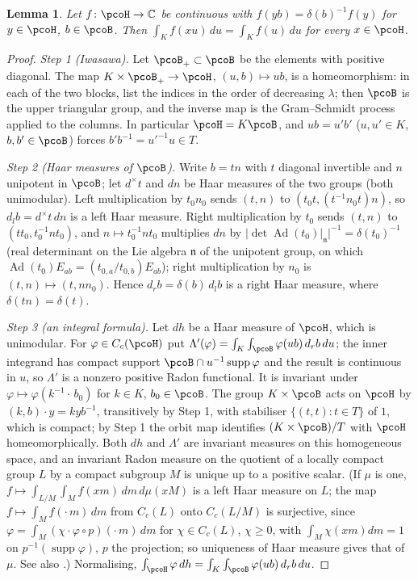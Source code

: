 \documentclass[10pt]{amsart}
\newtheorem{lemma}[theorem]{Lemma}
\theoremstyle{definition}
\theoremstyle{remark}
\newcommand{\C}{\mathbb C}
\begin{document}
\begin{lemma}\label{pco:density}
Let $f\colon\pcoH\to\C$ be continuous with $f(yb)=\delta(b)^{-1}f(y)$ for $y\in\pcoH$, $b\in\pcoB$.
Then $\int_Kf(xu)\,du=\int_Kf(u)\,du$ for every $x\in\pcoH$.
\end{lemma}
\begin{proof}
\emph{Step 1 (Iwasawa).} Let $\pcoB_+\subset\pcoB$ be the elements with positive diagonal. The map
$K\times\pcoB_+\to\pcoH$, $(u,b)\mapsto ub$, is a homeomorphism: in each of the two blocks, list
the indices in the order of decreasing $\lambda$; then $\pcoB$ is the upper triangular group, and
the inverse map is the Gram--Schmidt process applied to the columns. In particular $\pcoH=K\pcoB$,
and $ub=u'b'$ ($u,u'\in K$, $b,b'\in\pcoB$) forces $b'b^{-1}=u'^{-1}u\in T$.

\emph{Step 2 (Haar measures of $\pcoB$).} Write $b=tn$ with $t$ diagonal invertible and $n$
unipotent in $\pcoB$; let $d^\times t$ and $dn$ be Haar measures of the two groups (both
unimodular). Left multiplication by $t_0n_0$ sends $(t,n)$ to $(t_0t,(t^{-1}n_0t)n)$, so
$d_lb=d^\times t\,dn$ is a left Haar measure. Right multiplication by $t_0$ sends $(t,n)$ to
$(tt_0,t_0^{-1}nt_0)$, and $n\mapsto t_0^{-1}nt_0$ multiplies $dn$ by $|\det\operatorname{Ad}(t_0)|
_{\mathfrak n}|^{-1}=\delta(t_0)^{-1}$ (real determinant on the Lie algebra $\mathfrak n$ of the
unipotent group, on which $\operatorname{Ad}(t_0)E_{ab}=(t_{0,a}/t_{0,b})E_{ab}$); right
multiplication by $n_0$ is $(t,n)\mapsto(t,nn_0)$. Hence $d_rb=\delta(b)\,d_lb$ is a right Haar
measure, where $\delta(tn)=\delta(t)$.

\emph{Step 3 (an integral formula).} Let $dh$ be a Haar measure of $\pcoH$, which is unimodular. For
$\varphi\in C_c(\pcoH)$ put $\Lambda'(\varphi)=\int_K\int_{\pcoB}\varphi(ub)\,d_rb\,du$; the inner
integrand has compact support $\pcoB\cap u^{-1}\operatorname{supp}\varphi$ and the result is
continuous in $u$, so $\Lambda'$ is a nonzero positive Radon functional. It is invariant under
$\varphi\mapsto\varphi(k^{-1}\cdot\,b_0)$ for $k\in K$, $b_0\in\pcoB$. The group $K\times\pcoB$ acts
on $\pcoH$ by $(k,b)\cdot y=kyb^{-1}$, transitively by Step 1, with stabiliser $\{(t,t):t\in T\}$ of
$1$, which is compact; by Step 1 the orbit map identifies $(K\times\pcoB)/T$ with $\pcoH$
homeomorphically. Both $dh$ and $\Lambda'$ are invariant measures on this homogeneous space, and
an invariant Radon measure on the quotient of a locally compact group $L$ by a compact subgroup $M$ is
unique up to a positive scalar. (If $\mu$ is one, $f\mapsto\int_{L/M}\int_Mf(xm)\,dm\,d\mu(xM)$ is a
left Haar measure on $L$; the map $f\mapsto\int_Mf(\cdot\,m)\,dm$ from $C_c(L)$ onto $C_c(L/M)$ is
surjective, since $\varphi=\int_M(\chi\cdot\varphi\circ p)(\cdot\,m)\,dm$ for $\chi\in C_c(L)$, $\chi\ge0$, with
$\int_M\chi(xm)dm=1$ on $p^{-1}(\operatorname{supp}\varphi)$, $p$ the projection; so uniqueness of Haar measure
gives that of $\mu$. See also \cite[\S2.6, Proposition~(2.48) and Theorem~(2.49), pp.~56--57]{FollandAHA}.) Normalising,
$\int_{\pcoH}\varphi\,dh=\int_K\int_{\pcoB}\varphi(ub)\,d_rb\,du$.


\end{proof}
\end{document}
